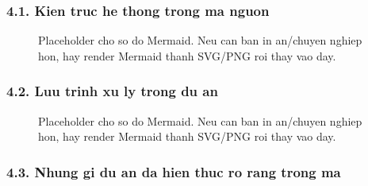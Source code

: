 \documentclass[
  vietnamese,
  a4paper,
  11pt]{article}
\begin{document}
\subsubsection{4.1. Kien truc he thong trong ma
nguon}\label{kien-truc-he-thong-trong-ma-nguon}

\begin{figure}[H]
\centering
{}
\caption{Placeholder cho so do Mermaid. Neu can ban in an/chuyen nghiep hon, hay render Mermaid thanh SVG/PNG roi thay vao day.}
\end{figure}

\subsubsection{4.2. Luu trinh xu ly trong du
an}\label{luu-trinh-xu-ly-trong-du-an}

\begin{figure}[H]
\centering
{}
\caption{Placeholder cho so do Mermaid. Neu can ban in an/chuyen nghiep hon, hay render Mermaid thanh SVG/PNG roi thay vao day.}
\end{figure}

\subsubsection{4.3. Nhung gi du an da hien thuc ro rang trong
ma}\label{nhung-gi-du-an-da-hien-thuc-ro-rang-trong-ma}
\end{document}

